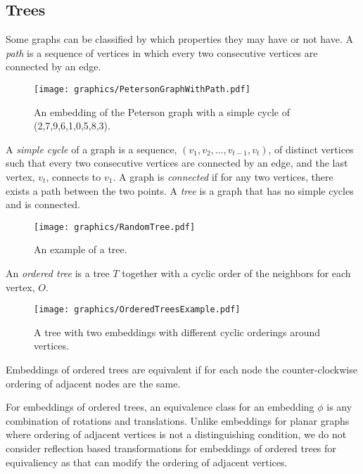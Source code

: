 \subsection{Trees}
Some graphs can be classified by which properties they may have or not have.
A \textit{path} is a sequence of vertices in which every two consecutive vertices are connected by an edge.   
\begin{figure}[!htbp]
\begin{center}
\texttt{[image: graphics/PetersonGraphWithPath.pdf]}
\caption{An embedding of the Peterson graph with a simple cycle of 
(2,7,9,6,1,0,5,8,3).}\label{fig:ch1-graph-2}
\end{center}
\end{figure}
A \textit{simple cycle} of a graph is a sequence, $(v_1, v_2, \dots, v_{t-1},v_t)$, of distinct vertices such that every two consecutive vertices are connected by an edge,  and the last vertex, $v_t$, connects to $v_1$.  
A graph is \textit{connected} if for any two vertices, there exists a path between the two points.
A \textit{tree} is a graph that has no simple cycles and is connected.
\begin{figure}[!htbp]
\begin{center}
\texttt{[image: graphics/RandomTree.pdf]}
\caption{An example of a tree.}\label{fig:ch1-graph-2}
\end{center}
\end{figure}


An \textit{ordered tree} is a tree $T$ together with a cyclic order of the neighbors for each vertex, $O$.
\begin{figure}[!htbp]
\begin{center}
    \texttt{[image: graphics/OrderedTreesExample.pdf]}
    \caption{A tree with two embeddings with different cyclic orderings around 
vertices.}\label{fig:ch1-graph-6}
\end{center}
\end{figure}
Embeddings of ordered trees are equivalent if for each node the counter-clockwise ordering of 
adjacent nodes are the same.

For embeddings of ordered trees, an equivalence class for an embedding $\phi$ is any combination of rotations and translations. 
Unlike embeddings for planar graphs where ordering of adjacent vertices is not a distinguishing condition,  we do not consider reflection based transformations for embeddings of ordered trees for equivaliency as that can modify the ordering of adjacent vertices.



